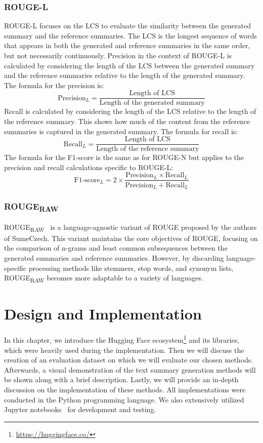 \documentclass[english, ba, kiv, he, iso690numb, pdf, viewonly]{fasthesis}
\begin{document}
\subsection{ROUGE-L}
ROUGE-L focuses on the LCS to evaluate the similarity between the generated summary and the reference summaries. The LCS is the longest sequence of words that appears in both the generated and reference summaries in the same order, but not necessarily continuously. 
Precision in the context of ROUGE-L is calculated by considering the length of the LCS between the generated summary and the reference summaries relative to the length of the generated summary. The formula for the precision is:
$$
\text{Precision}_{L} = \frac{\text{Length of LCS}}{\text{Length of the generated summary}}
$$
Recall is calculated by considering the length of the LCS relative to the length of the reference summary. This shows how much of the content from the reference summaries is captured in the generated summary. The formula for recall is:
$$
\text{Recall}_{L} = \frac{\text{Length of LCS}}{\text{Length of the reference summary}}
$$
The formula for the F1-score is the same as for ROUGE-N but applies to the precision and recall calculations specific to ROUGE-L:
$$
\text{F1-score}_{L} = 2 \times \frac{\text{Precision}_{L} \times \text{Recall}_{L}}{\text{Precision}_{L} + \text{Recall}_{L}}
$$
\subsection{ROUGE\textsubscript{RAW}}
ROUGE\textsubscript{RAW}~\cite{straka-etal-2018-sumeczech} is a language-agnostic variant of ROUGE proposed by the authors of SumeCzech. This variant maintains the core objectives of ROUGE, focusing on the comparison of n-grams and least common subsequences between the generated summaries and reference summaries. However, by discarding language-specific processing methods like stemmers, stop words, and synonym lists, ROUGE\textsubscript{RAW} becomes more adaptable to a variety of languages.

\chapter{Design and Implementation} \label{char:implementation}
In this chapter, we introduce the Hugging Face ecosystem\footnote{\url{https://huggingface.co/}} and its libraries, which were heavily used during the implementation. Then we will discuss the creation of an evaluation dataset on which we will evaluate our chosen methods. Afterwards, a visual demonstration of the text summary generation methods will be shown along with a brief description. Lastly, we will provide an in-depth discussion on the implementation of these methods. All implementations were conducted in the Python programming language. We also extensively utilized Jupyter notebooks~\cite{Kluyver2016jupyter} for development and testing.
\end{document}
